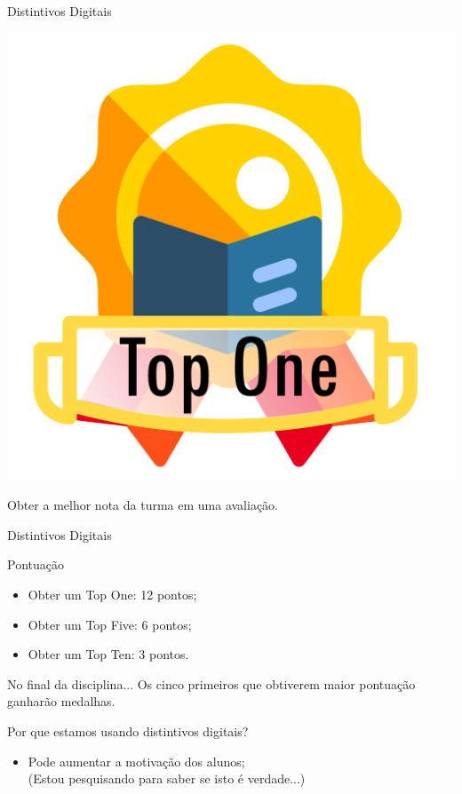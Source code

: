 \documentclass[xcolor=dvipsnames,table]{beamer}
\begin{document}
	\begin{frame}{Distintivos Digitais}
		\begin{block}{}
			\begin{center}
				\includegraphics[height=.65\textheight]{images/badges/top-one.png}
			\end{center}		
			Obter a melhor nota da turma em uma avaliação. 
		\end{block}
	\end{frame}
	
	\begin{frame}{Distintivos Digitais}
		\begin{block}{Pontuação}
			\begin{itemize}
				\item Obter um {\sc Top One}: 12 pontos;
				\item Obter um {\sc Top Five}: 6 pontos;
				\item Obter um {\sc Top Ten}: 3 pontos.
			\end{itemize}
		\end{block} \pause
		\begin{exampleblock}{No final da disciplina...}
			Os cinco primeiros que obtiverem maior pontuação ganharão medalhas.
		\end{exampleblock} \pause
		\begin{block}{Por que estamos usando distintivos digitais?}
			\begin{itemize}
				\item Pode aumentar a motivação dos alunos; \\ \pause
				{\color{blue} (Estou pesquisando para saber se isto é verdade...)}
			\end{itemize}
		\end{block}
	\end{frame}
	
\end{document}
